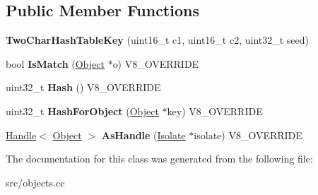 \subsection*{Public Member Functions}
\begin{DoxyCompactItemize}
\item 
\hypertarget{classv8_1_1internal_1_1_two_char_hash_table_key_a7d1505bb428042637cd2ea5b597da779}{}{\bfseries Two\+Char\+Hash\+Table\+Key} (uint16\+\_\+t c1, uint16\+\_\+t c2, uint32\+\_\+t seed)\label{classv8_1_1internal_1_1_two_char_hash_table_key_a7d1505bb428042637cd2ea5b597da779}

\item 
\hypertarget{classv8_1_1internal_1_1_two_char_hash_table_key_af8dadb1ac3698349283d5fcfb0026e80}{}bool {\bfseries Is\+Match} (\hyperlink{classv8_1_1internal_1_1_object}{Object} $\ast$o) V8\+\_\+\+O\+V\+E\+R\+R\+I\+D\+E\label{classv8_1_1internal_1_1_two_char_hash_table_key_af8dadb1ac3698349283d5fcfb0026e80}

\item 
\hypertarget{classv8_1_1internal_1_1_two_char_hash_table_key_ade6d7c614d3bcd828046297f50dea4b0}{}uint32\+\_\+t {\bfseries Hash} () V8\+\_\+\+O\+V\+E\+R\+R\+I\+D\+E\label{classv8_1_1internal_1_1_two_char_hash_table_key_ade6d7c614d3bcd828046297f50dea4b0}

\item 
\hypertarget{classv8_1_1internal_1_1_two_char_hash_table_key_a74abf569fa95348a31cfbbabd039818c}{}uint32\+\_\+t {\bfseries Hash\+For\+Object} (\hyperlink{classv8_1_1internal_1_1_object}{Object} $\ast$key) V8\+\_\+\+O\+V\+E\+R\+R\+I\+D\+E\label{classv8_1_1internal_1_1_two_char_hash_table_key_a74abf569fa95348a31cfbbabd039818c}

\item 
\hypertarget{classv8_1_1internal_1_1_two_char_hash_table_key_a890b83898197594a57488a626014d6b3}{}\hyperlink{classv8_1_1internal_1_1_handle}{Handle}$<$ \hyperlink{classv8_1_1internal_1_1_object}{Object} $>$ {\bfseries As\+Handle} (\hyperlink{classv8_1_1internal_1_1_isolate}{Isolate} $\ast$isolate) V8\+\_\+\+O\+V\+E\+R\+R\+I\+D\+E\label{classv8_1_1internal_1_1_two_char_hash_table_key_a890b83898197594a57488a626014d6b3}

\end{DoxyCompactItemize}


The documentation for this class was generated from the following file\+:\begin{DoxyCompactItemize}
\item 
src/objects.\+cc\end{DoxyCompactItemize}
